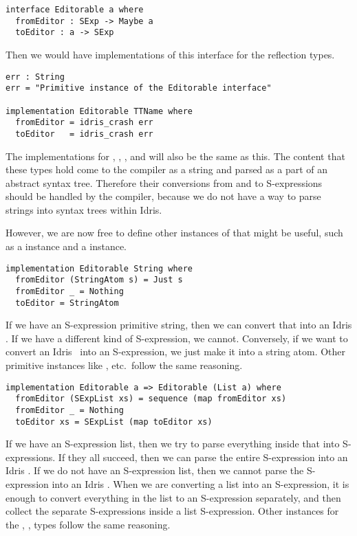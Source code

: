 \begin{Verbatim}
interface Editorable a where
  fromEditor : SExp -> Maybe a
  toEditor : a -> SExp
\end{Verbatim}

Then we would have implementations of this interface for the reflection types.

\begin{Verbatim}
err : String
err = "Primitive instance of the Editorable interface"

implementation Editorable TTName where
  fromEditor = idris_crash err
  toEditor   = idris_crash err
\end{Verbatim}

The implementations for , , ,  and
 will also be the same as this.
The content that these types hold come to the compiler as a string and parsed
as a part of an abstract syntax tree. Therefore their conversions from and to
S-expressions should be handled by the compiler, because we do not have a way
to parse strings into syntax trees within Idris.

However, we are now free to define other instances of  that
might be useful, such as a \String instance and a  instance.

\begin{Verbatim}
implementation Editorable String where
  fromEditor (StringAtom s) = Just s
  fromEditor _ = Nothing
  toEditor = StringAtom
\end{Verbatim}

If we have an S-expression primitive string, then we can convert that into
an Idris \String. If we have a different kind of S-expression, we cannot.
Conversely, if we want to convert an Idris \String\ into an S-expression, we
just make it into a string atom. Other primitive instances like ,
 etc.\ follow the same reasoning.

\begin{Verbatim}
implementation Editorable a => Editorable (List a) where
  fromEditor (SExpList xs) = sequence (map fromEditor xs)
  fromEditor _ = Nothing
  toEditor xs = SExpList (map toEditor xs)
\end{Verbatim}

If we have an S-expression list, then we try to parse everything inside that
into S-expressions. If they all succeed, then we can parse the entire
S-expression into an Idris . If we do not have an S-expression list,
then we cannot parse the S-expression into an Idris .  When we are
converting a list into an S-expression, it is enough to convert everything in
the list to an S-expression separately, and then collect the separate
S-expressions inside a list S-expression. Other instances for the ,
,  types follow the same reasoning.

